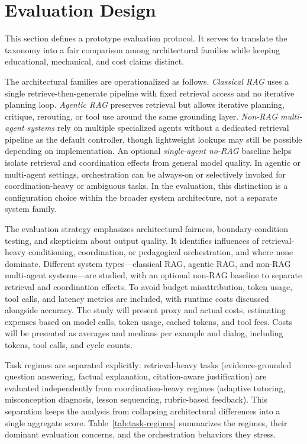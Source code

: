 \section{Evaluation Design}

This section defines a prototype evaluation protocol. It serves to translate the taxonomy into a fair comparison among architectural families while keeping educational, mechanical, and cost claims distinct.

The architectural families are operationalized as follows. \emph{Classical RAG} uses a single retrieve-then-generate pipeline with fixed retrieval access and no iterative planning loop. \emph{Agentic RAG} preserves retrieval but allows iterative planning, critique, rerouting, or tool use around the same grounding layer. \emph{Non-RAG multi-agent systems} rely on multiple specialized agents without a dedicated retrieval pipeline as the default controller, though lightweight lookups may still be possible depending on implementation. An optional \emph{single-agent no-RAG} baseline helps isolate retrieval and coordination effects from general model quality. In agentic or multi-agent settings, orchestration can be always-on or selectively invoked for coordination-heavy or ambiguous tasks. In the evaluation, this distinction is a configuration choice within the broader system architecture, not a separate system family.

The evaluation strategy emphasizes architectural fairness, boundary-condition testing, and skepticism about output quality. It identifies influences of retrieval-heavy conditioning, coordination, or pedagogical orchestration, and where none dominate. Different system types—classical RAG, agentic RAG, and non-RAG multi-agent systems—are studied, with an optional non-RAG baseline to separate retrieval and coordination effects. To avoid budget misattribution, token usage, tool calls, and latency metrics are included, with runtime costs discussed alongside accuracy. The study will present proxy and actual costs, estimating expenses based on model calls, token usage, cached tokens, and tool fees. Costs will be presented as averages and medians per example and dialog, including tokens, tool calls, and cycle counts.

Task regimes are separated explicitly: retrieval-heavy tasks (evidence-grounded question answering, factual explanation, citation-aware justification) are evaluated independently from coordination-heavy regimes (adaptive tutoring, misconception diagnosis, lesson sequencing, rubric-based feedback). This separation keeps the analysis from collapsing architectural differences into a single aggregate score. Table~\ref{tab:task-regimes} summarizes the regimes, their dominant evaluation concerns, and the orchestration behaviors they stress.

